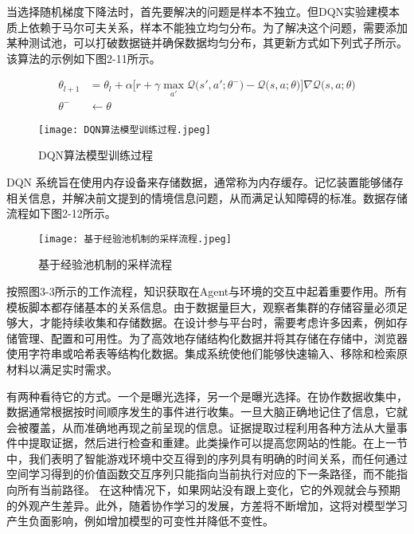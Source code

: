 当选择随机梯度下降法时，首先要解决的问题是样本不独立。但DQN实验建模本质上依赖于马尔可夫关系，样本不能独立均匀分布。为了解决这个问题，需要添加某种测试池，可以打破数据链并确保数据均匀分布，其更新方式如下列式子所示。该算法的示例如下图2-11所示。

\begin{align}
	\theta_{l+1} &= \theta_l + \alpha \bigg[ r + \gamma \max_{a'} \mathcal{Q}\Big(s', a'; \theta^- \Big) - \mathcal{Q}\big(s, a; \theta\big) \bigg] \nabla \mathcal{Q}\big(s, a; \theta\big) \\
	\theta^- &\leftarrow \theta
\end{align}

\begin{figure}[hbt]
	\centering
	\texttt{[image: DQN算法模型训练过程.jpeg]}
	\caption{DQN算法模型训练过程}
	\label{f.example}
\end{figure}


DQN 系统旨在使用内存设备来存储数据，通常称为内存缓存\cite{wawrzynski2013autonomous}。记忆装置能够储存相关信息，并解决前文提到的情境信息问题，从而满足认知障碍的标准。数据存储流程如下图2-12所示。

\begin{figure}[hbt]
	\centering
	\texttt{[image: 基于经验池机制的采样流程.jpeg]}
	\caption{基于经验池机制的采样流程}
	\label{f.example}
\end{figure}

按照图3-3所示的工作流程，知识获取在Agent与环境的交互中起着重要作用。所有模板脚本都存储基本的关系信息。由于数据量巨大，观察者集群的存储容量必须足够大，才能持续收集和存储数据。在设计参与平台时，需要考虑许多因素，例如存储管理、配置和可用性。为了高效地存储结构化数据并将其存储在存储中，浏览器使用字符串或哈希表等结构化数据。集成系统使他们能够快速输入、移除和检索原材料以满足实时需求。

有两种看待它的方式。一个是曝光选择，另一个是曝光选择。在协作数据收集中，数据通常根据按时间顺序发生的事件进行收集。一旦大脑正确地记住了信息，它就会被覆盖，从而准确地再现之前呈现的信息。证据提取过程利用各种方法从大量事件中提取证据，然后进行检查和重建。此类操作可以提高您网站的性能。在上一节中，我们表明了智能游戏环境中交互得到的序列具有明确的时间关系，而任何通过空间学习得到的价值函数交互序列只能指向当前执行对应的下一条路径，而不能指向所有当前路径。
在这种情况下，如果网站没有跟上变化，它的外观就会与预期的外观产生差异。此外，随着协作学习的发展，方差将不断增加，这将对模型学习产生负面影响，例如增加模型的可变性并降低不变性。

